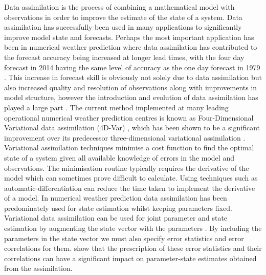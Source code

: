 \documentclass[review]{elsarticle}
\begin{document}
Data assimilation is the process of combining a mathematical model with observations in order to improve the estimate of the state of a system. Data assimilation has successfully been used in many applications to significantly improve model state and forecasts. Perhaps the most important application has been in numerical weather prediction where data assimilation has contributed to the forecast accuracy being increased at longer lead times, with the four day forecast in 2014 having the same level of accuracy as the one day forecast in 1979 \citep{bauer2015quiet}. This increase in forecast skill is obviously not solely due to data assimilation but also increased quality and resolution of observations along with improvements in model structure, however the introduction and evolution of data assimilation has played a large part \citep{dee2011era}. The current method implemented at many leading operational numerical weather prediction centres is known as Four-Dimensional Variational data assimilation (4D-Var) \citep{QJ:QJ2652, QJ:QJ2054}, which has been shown to be a significant improvement over its predecessor three-dimensional variational assimilation \citep{lorenc2005does}. Variational assimilation techniques minimise a cost function to find the optimal state of a system given all available knowledge of errors in the model and observations. The minimisation routine typically requires the derivative of the model which can sometimes prove difficult to calculate. Using techniques such as automatic-differentiation \citep{renaud1997automatic} can reduce the time taken to implement the derivative of a model. In numerical weather prediction data assimilation has been predominately used for state estimation whilst keeping parameters fixed. Variational data assimilation can be used for joint parameter and state estimation by augmenting the state vector with the parameters \citep{navon1998practical}. By including the parameters in the state vector we must also specify error statistics and error correlations for them. \citet{smith2009variational} show that the prescription of these error statistics and their correlations can have a significant impact on parameter-state estimates obtained from the assimilation.
\end{document}
